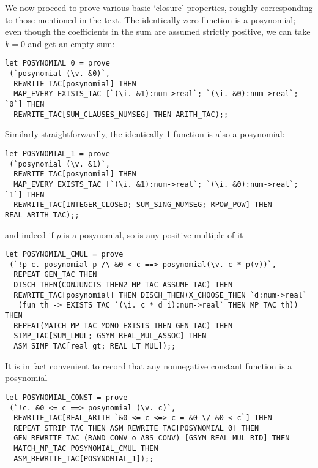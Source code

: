 \documentclass[10pt]{article}
\theoremstyle{definition}
\theoremstyle{remark}
\numberwithin{equation}{section}
\begin{document}
We now proceed to prove various basic `closure' properties, roughly
corresponding to those mentioned in the text. The identically zero function is
a posynomial; even though the coefficients in the sum are assumed strictly
positive, we can take $k = 0$ and get an empty sum:

\begin{scriptsize}\begin{verbatim}
let POSYNOMIAL_0 = prove
 (`posynomial (\v. &0)`,
  REWRITE_TAC[posynomial] THEN
  MAP_EVERY EXISTS_TAC [`(\i. &1):num->real`; `(\i. &0):num->real`; `0`] THEN
  REWRITE_TAC[SUM_CLAUSES_NUMSEG] THEN ARITH_TAC);;
\end{verbatim}\end{scriptsize}

Similarly straightforwardly, the identically 1 function is also a posynomial:

\begin{scriptsize}\begin{verbatim}
let POSYNOMIAL_1 = prove
 (`posynomial (\v. &1)`,
  REWRITE_TAC[posynomial] THEN
  MAP_EVERY EXISTS_TAC [`(\i. &1):num->real`; `(\i. &0):num->real`; `1`] THEN
  REWRITE_TAC[INTEGER_CLOSED; SUM_SING_NUMSEG; RPOW_POW] THEN REAL_ARITH_TAC);;
\end{verbatim}\end{scriptsize}

\noindent and indeed if $p$ is a posynomial, so is any positive multiple of it

\begin{scriptsize}\begin{verbatim}
let POSYNOMIAL_CMUL = prove
 (`!p c. posynomial p /\ &0 < c ==> posynomial(\v. c * p(v))`,
  REPEAT GEN_TAC THEN
  DISCH_THEN(CONJUNCTS_THEN2 MP_TAC ASSUME_TAC) THEN
  REWRITE_TAC[posynomial] THEN DISCH_THEN(X_CHOOSE_THEN `d:num->real`
   (fun th -> EXISTS_TAC `(\i. c * d i):num->real` THEN MP_TAC th)) THEN
  REPEAT(MATCH_MP_TAC MONO_EXISTS THEN GEN_TAC) THEN
  SIMP_TAC[SUM_LMUL; GSYM REAL_MUL_ASSOC] THEN
  ASM_SIMP_TAC[real_gt; REAL_LT_MUL]);;
\end{verbatim}\end{scriptsize}

It is in fact convenient to record that any nonnegative constant function is a
posynomial

\begin{scriptsize}\begin{verbatim}
let POSYNOMIAL_CONST = prove
 (`!c. &0 <= c ==> posynomial (\v. c)`,
  REWRITE_TAC[REAL_ARITH `&0 <= c <=> c = &0 \/ &0 < c`] THEN
  REPEAT STRIP_TAC THEN ASM_REWRITE_TAC[POSYNOMIAL_0] THEN
  GEN_REWRITE_TAC (RAND_CONV o ABS_CONV) [GSYM REAL_MUL_RID] THEN
  MATCH_MP_TAC POSYNOMIAL_CMUL THEN
  ASM_REWRITE_TAC[POSYNOMIAL_1]);;
\end{verbatim}\end{scriptsize}
\end{document}
